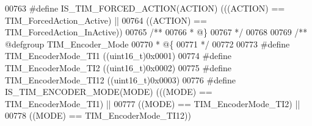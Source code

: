 \begin{DoxyCode}
00763 \textcolor{preprocessor}{#}\textcolor{preprocessor}{define} \textcolor{preprocessor}{IS\_TIM\_FORCED\_ACTION}\textcolor{preprocessor}{(}\textcolor{preprocessor}{ACTION}\textcolor{preprocessor}{)} \textcolor{preprocessor}{(}\textcolor{preprocessor}{(}\textcolor{preprocessor}{(}\textcolor{preprocessor}{ACTION}\textcolor{preprocessor}{)} \textcolor{preprocessor}{==} TIM_ForcedAction_Active\textcolor{preprocessor}{)} \textcolor{preprocessor}{||}
00764                                       \textcolor{preprocessor}{(}\textcolor{preprocessor}{(}\textcolor{preprocessor}{ACTION}\textcolor{preprocessor}{)} \textcolor{preprocessor}{==} 
      TIM_ForcedAction_InActive\textcolor{preprocessor}{)}\textcolor{preprocessor}{)}
00765 \textcolor{comment}{/**}
00766 \textcolor{comment}{  * @\}}
00767 \textcolor{comment}{  */}
00768 
00769 \textcolor{comment}{/** @defgroup TIM\_Encoder\_Mode }
00770 \textcolor{comment}{  * @\{}
00771 \textcolor{comment}{  */}
00772 
00773 \textcolor{preprocessor}{#}\textcolor{preprocessor}{define} \textcolor{preprocessor}{TIM\_EncoderMode\_TI1}                \textcolor{preprocessor}{(}\textcolor{preprocessor}{(}\textcolor{preprocessor}{uint16\_t}\textcolor{preprocessor}{)}0x0001\textcolor{preprocessor}{)}
00774 \textcolor{preprocessor}{#}\textcolor{preprocessor}{define} \textcolor{preprocessor}{TIM\_EncoderMode\_TI2}                \textcolor{preprocessor}{(}\textcolor{preprocessor}{(}\textcolor{preprocessor}{uint16\_t}\textcolor{preprocessor}{)}0x0002\textcolor{preprocessor}{)}
00775 \textcolor{preprocessor}{#}\textcolor{preprocessor}{define} \textcolor{preprocessor}{TIM\_EncoderMode\_TI12}               \textcolor{preprocessor}{(}\textcolor{preprocessor}{(}\textcolor{preprocessor}{uint16\_t}\textcolor{preprocessor}{)}0x0003\textcolor{preprocessor}{)}
00776 \textcolor{preprocessor}{#}\textcolor{preprocessor}{define} \textcolor{preprocessor}{IS\_TIM\_ENCODER\_MODE}\textcolor{preprocessor}{(}\textcolor{preprocessor}{MODE}\textcolor{preprocessor}{)} \textcolor{preprocessor}{(}\textcolor{preprocessor}{(}\textcolor{preprocessor}{(}\textcolor{preprocessor}{MODE}\textcolor{preprocessor}{)} \textcolor{preprocessor}{==} TIM_EncoderMode_TI1\textcolor{preprocessor}{)} \textcolor{preprocessor}{||}
00777                                    \textcolor{preprocessor}{(}\textcolor{preprocessor}{(}\textcolor{preprocessor}{MODE}\textcolor{preprocessor}{)} \textcolor{preprocessor}{==} TIM_EncoderMode_TI2\textcolor{preprocessor}{)} \textcolor{preprocessor}{||}
00778                                    \textcolor{preprocessor}{(}\textcolor{preprocessor}{(}\textcolor{preprocessor}{MODE}\textcolor{preprocessor}{)} \textcolor{preprocessor}{==} TIM_EncoderMode_TI12\textcolor{preprocessor}{)}\textcolor{preprocessor}{)}

\end{DoxyCode}
